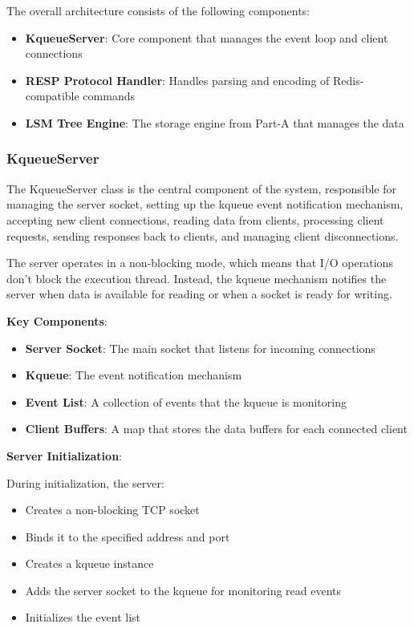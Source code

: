 \documentclass{article}
\begin{document}
\noindent The overall architecture consists of the following components:

\begin{itemize}
    \item \textbf{KqueueServer}: Core component that manages the event loop and client connections
    \item \textbf{RESP Protocol Handler}: Handles parsing and encoding of Redis-compatible commands
    \item \textbf{LSM Tree Engine}: The storage engine from Part-A that manages the data
\end{itemize}

\subsubsection{KqueueServer}

The KqueueServer class is the central component of the system, responsible for managing the server socket, setting up the kqueue event notification mechanism, accepting new client connections, reading data from clients, processing client requests, sending responses back to clients, and managing client disconnections.

\noindent The server operates in a non-blocking mode, which means that I/O operations don't block the execution thread. Instead, the kqueue mechanism notifies the server when data is available for reading or when a socket is ready for writing.

\noindent \textbf{Key Components}:

\begin{itemize}
    \item \textbf{Server Socket}: The main socket that listens for incoming connections
    \item \textbf{Kqueue}: The event notification mechanism
    \item \textbf{Event List}: A collection of events that the kqueue is monitoring
    \item \textbf{Client Buffers}: A map that stores the data buffers for each connected client
\end{itemize}

\noindent \textbf{Server Initialization}:

During initialization, the server:
\begin{itemize}
    \item Creates a non-blocking TCP socket
    \item Binds it to the specified address and port
    \item Creates a kqueue instance
    \item Adds the server socket to the kqueue for monitoring read events
    \item Initializes the event list
\end{itemize}
\end{document}
